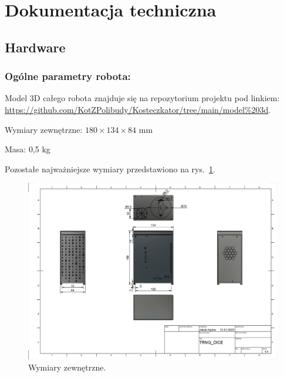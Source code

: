 \section{Dokumentacja techniczna}\label{sec:dokumentacja-techniczna}

\subsection{Hardware}
\label{subsec:hardware}
\subsubsection{Ogólne parametry robota:}
Model 3D całego robota znajduje się na repozytorium projektu pod linkiem: \url{https://github.com/KotZPolibudy/Kosteczkator/tree/main/model%203d}.

Wymiary zewnętrzne: $180 \times 134 \times 84$ mm

Masa: 0,5 kg

Pozostałe najważniejsze wymiary przedstawiono na rys.~\ref{fig:wymiary}.
\begin{figure}[H]
    \centering
    \includegraphics[width=0.95\linewidth]{chapters/03-praca-wlasna/figures/wymiary}
    \caption{\label{fig:wymiary}Wymiary zewnętrzne.}
\end{figure}

